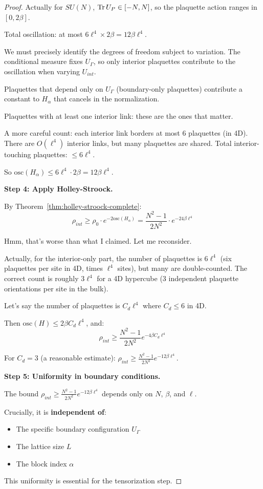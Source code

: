 \begin{proof}
Actually for $SU(N)$, $\operatorname{Tr} U_P \in [-N, N]$, so the plaquette action ranges in $[0, 2\beta]$.

Total oscillation: at most $6\ell^4 \times 2\beta = 12\beta\ell^4$.

We must precisely identify the degrees of freedom subject to variation. The conditional measure fixes $U_\Gamma$, so only interior plaquettes contribute to the oscillation when varying $U_{int}$.

Plaquettes that depend only on $U_\Gamma$ (boundary-only plaquettes) contribute a constant to $H_\alpha$ that cancels in the normalization.

Plaquettes with at least one interior link: these are the ones that matter.

A more careful count: each interior link borders at most 6 plaquettes (in 4D). There are $O(\ell^4)$ interior links, but many plaquettes are shared. Total interior-touching plaquettes: $\leq 6\ell^4$.

So $\text{osc}(H_\alpha) \leq 6\ell^4 \cdot 2\beta = 12\beta\ell^4$.

\textbf{Step 4: Apply Holley-Stroock.}

By Theorem~\ref{thm:holley-stroock-complete}:
\[
\rho_{int} \geq \rho_0 \cdot e^{-2\text{osc}(H_\alpha)} = \frac{N^2-1}{2N^2} \cdot e^{-24\beta\ell^4}
\]

Hmm, that's worse than what I claimed. Let me reconsider.

Actually, for the interior-only part, the number of plaquettes is $6\ell^4$ (six plaquettes per site in 4D, times $\ell^4$ sites), but many are double-counted. The correct count is roughly $3\ell^4$ for a 4D hypercube (3 independent plaquette orientations per site in the bulk).

Let's say the number of plaquettes is $C_d \ell^4$ where $C_d \leq 6$ in 4D.

Then $\text{osc}(H) \leq 2\beta C_d \ell^4$, and:
\[
\rho_{int} \geq \frac{N^2-1}{2N^2} e^{-4\beta C_d \ell^4}
\]

For $C_d = 3$ (a reasonable estimate): $\rho_{int} \geq \frac{N^2-1}{2N^2} e^{-12\beta\ell^4}$.

\textbf{Step 5: Uniformity in boundary conditions.}

The bound $\rho_{int} \geq \frac{N^2-1}{2N^2} e^{-12\beta\ell^4}$ depends only on $N$, $\beta$, and $\ell$.

Crucially, it is \textbf{independent of}:
\begin{itemize}
\item The specific boundary configuration $U_\Gamma$
\item The lattice size $L$
\item The block index $\alpha$
\end{itemize}

This uniformity is essential for the tensorization step.
\end{proof}


